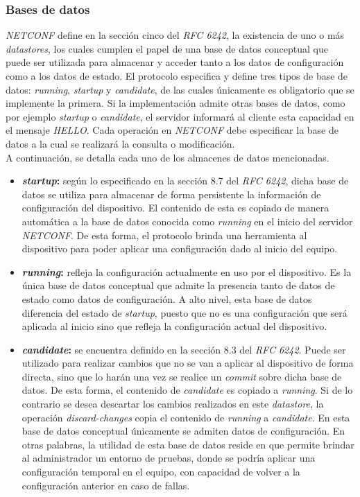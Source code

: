   \subsubsection{Bases de datos}
  \textit{NETCONF} define en la sección cinco del \textit{RFC 6242}, la existencia de uno o más \textit{datastores}, los cuales cumplen el papel de una base de datos conceptual que puede ser utilizada para almacenar y acceder tanto a los datos de configuración como a los datos de estado. El protocolo especifica y define tres tipos de base de datos: \textit{running}, \textit{startup} y \textit{candidate}, de las cuales únicamente es obligatorio que se implemente la primera. Si la implementación admite otras bases de datos, como por ejemplo \textit{startup} o \textit{candidate}, el servidor informará al cliente esta capacidad en el mensaje \textit{HELLO}. Cada operación en \textit{NETCONF} debe especificar la base de datos a la cual se realizará la consulta o modificación.
  \\

  A continuación, se detalla cada uno de los almacenes de datos mencionadas.
\begin{itemize}
	\item \textbf{\textit{startup}:} según lo especificado en la sección 8.7 del \textit{RFC 6242}, dicha base de datos se utiliza para almacenar de forma persistente la información de configuración del dispositivo. El contenido de esta es copiado de manera automática a la base de datos conocida como \textit{running} en el inicio del servidor \textit{NETCONF}. De esta forma, el protocolo brinda una herramienta al dispositivo para poder aplicar una configuración dado al inicio del equipo. 
	\item \textbf{\textit{running}:} refleja la configuración actualmente en uso por el dispositivo. Es la única base de datos conceptual que admite la presencia tanto de datos de estado como datos de configuración. A alto nivel, esta base de datos diferencia del estado de \textit{startup}, puesto que no es una configuración que será aplicada al inicio sino que refleja la configuración actual del dispositivo.
	\item \textbf{\textit{candidate}:} se encuentra definido en la sección 8.3 del \textit{RFC 6242}. Puede ser utilizado para realizar cambios que no se van a aplicar al dispositivo de forma directa, sino que lo harán una vez se realice un \textit{commit} sobre dicha base de datos. De esta forma, el contenido de \textit{candidate} es copiado a \textit{running}. Si de lo contrario se desea descartar los cambios realizados en este \textit{datastore}, la operación \textit{discard-changes} copia el contenido de \textit{running} a \textit{candidate}. En esta base de datos conceptual únicamente se admiten datos de configuración. En otras palabras, la utilidad de esta base de datos reside en que permite brindar al administrador un entorno de pruebas, donde se podría aplicar una configuración temporal en el equipo, con capacidad de volver a la configuración anterior en caso de fallas.
\end{itemize}


